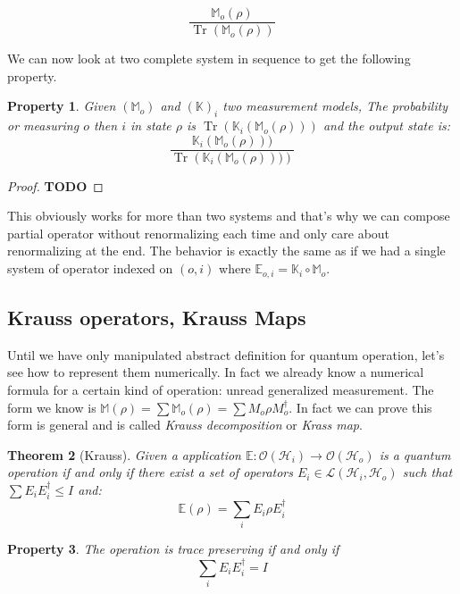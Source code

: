 \documentclass[10pt]{report}
\theoremstyle{plain}
\newtheorem{thm}{Theorem}[chapter]
\newtheorem{prop}[thm]{Property}
\theoremstyle{definition}
\theoremstyle{remark}
\newcommand{\TODO}{\textbf{TODO}}
\DeclareMathOperator{\Tr}{Tr}
\begin{document}
\newcommand{\trnorm}[1]{\frac{#1}{\Tr\left({#1}\right)}}

\[\trnorm{\mathbb M_o(\rho)}\]

We can now look at two complete system in sequence to get the following
property.

\begin{prop}\label{prop:qocomp}
  Given $(\mathbb M_o)$ and $(\mathbb K)_i$ two measurement models, The
  probability or measuring $o$ then $i$ in state $\rho$
  is $\Tr(\mathbb K_i (\mathbb M_o(\rho)))$ and the output state is:
  \[\trnorm{\mathbb K_i (\mathbb M_o(\rho)))}\]
\end{prop}

\begin{proof}
  \TODO{}
\end{proof}

This obviously works for more than two systems and that's why we can compose
partial operator without renormalizing each time and only care about
renormalizing at the end. The behavior is exactly the same as if we had a single
system of operator indexed on $(o,i)$ where $\mathbb E_{o,i} = \mathbb K_i \circ
\mathbb M_o$.

\subsection{Krauss operators, Krauss Maps}\label{ssec:kraus}

Until we have only manipulated abstract definition for quantum operation, let's
see how to represent them numerically. In fact we already know a numerical
formula for a certain kind of operation: unread generalized measurement. The
form we know is $\mathbb{M}(\rho) = \sum \mathbb M_o(\rho) = \sum M_o\rho
M_o^\dagger$. In fact we can prove this form is general and is called
\emph{Krauss decomposition} or \emph{Krass map}.

\begin{thm}[Krauss]
  Given a application $\mathbb E : \mathcal{O}(\mathcal{H}_i) \to
  \mathcal{O}(\mathcal{H}_o)$ is a quantum operation if and only if there exist
  a set of operators $E_i \in \mathcal{L}(\mathcal{H}_i, \mathcal{H}_o)$ such
  that $\sum E_i E_i^\dagger \le I$ and:
  \[\mathbb E(\rho) = \sum_i E_i\rho E_i^\dagger\]
\end{thm}

\begin{prop}
  The operation is trace preserving if and only if
\[\sum_i E_i E_i^\dagger = I\]
\end{prop}
\end{document}

